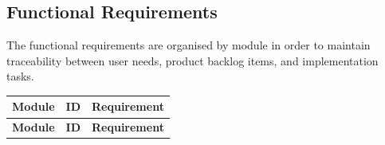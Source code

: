 \documentclass[a4paper,12pt]{report}
\begin{document}
\subsection{Functional Requirements}

The functional requirements are organised by module in order to maintain traceability between user needs, product backlog items, and implementation tasks.

\vspace{1cm}

\begin{longtable}{@{} L{0.24\textwidth} L{0.14\textwidth} L{0.54\textwidth} @{}}
\toprule
\textbf{Module} &
\textbf{ID} &
\textbf{Requirement} \\
\midrule
\endfirsthead

\toprule
\textbf{Module} &
\textbf{ID} &
\textbf{Requirement} \\
\midrule
\endhead


\end{longtable}
\end{document}
